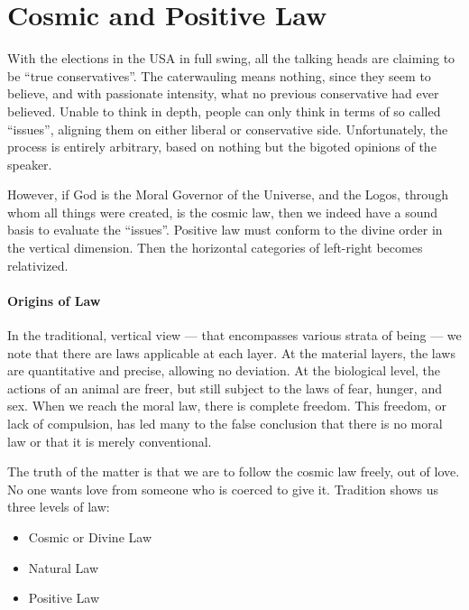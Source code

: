 \section{Cosmic and Positive Law}

With the elections in the USA in full swing, all the talking heads are claiming to be ``true conservatives''. The caterwauling means nothing, since they seem to believe, and with passionate intensity, what no previous conservative had ever believed. Unable to think in depth, people can only think in terms of so called ``issues'', aligning them on either liberal or conservative side. Unfortunately, the process is entirely arbitrary, based on nothing but the bigoted opinions of the speaker.

However, if God is the Moral Governor of the Universe, and the Logos, through whom all things were created, is the cosmic law, then we indeed have a sound basis to evaluate the ``issues''. Positive law must conform to the divine order in the vertical dimension. Then the horizontal categories of left-right becomes relativized.

\paragraph{Origins of Law}


In the traditional, vertical view --- that encompasses various strata of being --- we note that there are laws applicable at each layer. At the material layers, the laws are quantitative and precise, allowing no deviation. At the biological level, the actions of an animal are freer, but still subject to the laws of fear, hunger, and sex. When we reach the moral law, there is complete freedom. This freedom, or lack of compulsion, has led many to the false conclusion that there is no moral law or that it is merely conventional.

The truth of the matter is that we are to follow the cosmic law freely, out of love. No one wants love from someone who is coerced to give it. Tradition shows us three levels of law:

\begin{itemize}


\item Cosmic or Divine Law

\item Natural Law

\item Positive Law
\end{itemize}


